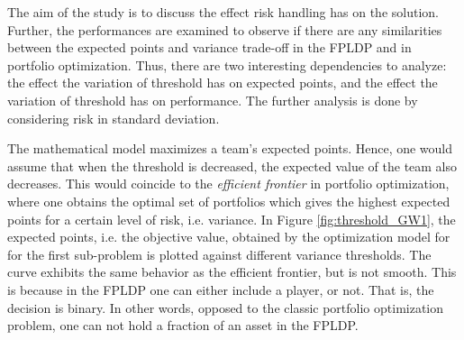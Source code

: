 \newpar

\newpar

The aim of the study is to discuss the effect risk handling has on the solution. Further, the performances are examined to observe if there are any similarities between the expected points and variance trade-off in the FPLDP and in portfolio optimization. Thus, there are two interesting dependencies to analyze: the effect the variation of threshold has on expected points, and the effect the variation of threshold has on performance. The further analysis is done by considering risk in standard deviation. 

\newpar

 

\newpar

The mathematical model maximizes a team's expected points. Hence, one would assume that when the threshold is decreased, the expected value of the team also decreases. This would coincide to the \textit{efficient frontier} in portfolio optimization, where one obtains the optimal set of portfolios which gives the highest expected points for a certain level of risk, i.e. variance. In Figure \ref{fig:threshold_GW1}, the expected points, i.e. the objective value, obtained by the optimization model for for the first sub-problem is plotted against different variance thresholds. The curve exhibits the same behavior as the efficient frontier, but is not smooth. This is because in the FPLDP one can either include a player, or not. That is, the decision is binary. In other words, opposed to the classic portfolio optimization problem, one can not hold a fraction of an asset in the FPLDP. 

